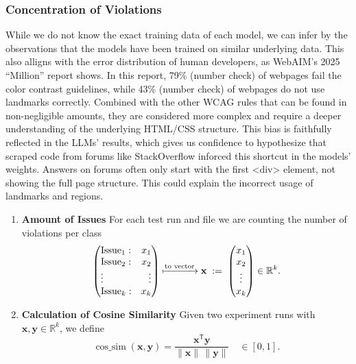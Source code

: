 \subsubsection{Concentration of Violations}
While we do not know 
the exact training data of each model, we can infer by the observations that the 
models have been trained on similar underlying data. This also alligns with the 
error distribution of human developers, as WebAIM’s 2025 “Million” report shows.
In this report, 79\% (number check) of webpages fail the color contrast guidelines,
while 43\% (number check) of webpages do not use landmarks correctly. 
Combined with the other WCAG rules that can be found in non-negligible amounts, 
they are considered more complex and require a deeper understanding of the 
underlying HTML/CSS structure. \newline
This bias is faithfully reflected in the LLMs'
results, which gives us confidence to hypothesize that scraped code from 
forums like StackOverflow inforced this shortcut in the models' weights. 
Answers on forums often only start with the first <div> element, not showing 
the full page structure. This could explain the incorrect usage of landmarks and 
regions.

\newcommand{\vect}[1]{\begin{pmatrix}#1\end{pmatrix}}
\newcommand{\issues}{k}                   %
\newcommand{\vx}{\mathbf x}
\newcommand{\vy}{\mathbf y}

\begin{enumerate}
  \item \textbf{Amount of Issues}  
        For each test run and file we are counting the number of violations per class
        \[
          \left(
            \begin{array}{@{}l r@{}}
              \text{Issue}_{1}: & x_{1}\\
              \text{Issue}_{2}: & x_{2}\\
              \vdots           & \vdots\\
              \text{Issue}_{\issues}: & x_{\issues}
            \end{array}
          \right)
          \xmapsto{\text{to vector}}
          \vx \;:=\;
          \vect{x_{1}\\x_{2}\\\vdots\\x_{\issues}} \in \mathbb R^{\issues}.
        \]

  \item \textbf{Calculation of Cosine Similarity}  
        Given two experiment runs with $\vx,\vy\in\mathbb R^{\issues}$, we define
        \[
          \operatorname{cos\_sim}(\vx,\vy)=
          \frac{\vx^{\mathsf T}\vy}{\lVert\vx\rVert\,\lVert\vy\rVert}
          \quad\in[0,1].
        \]
\end{enumerate}

